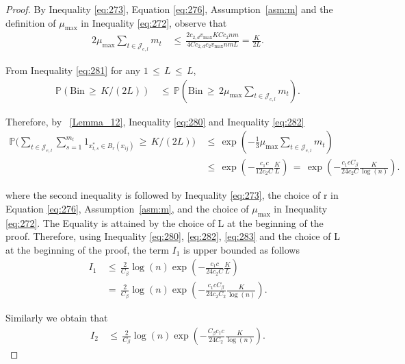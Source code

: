\documentclass[twoside,11pt]{article}
\begin{document}
\begin{proof}
By Inequality \eqref{eq:273}, Equation \eqref{eq:276}, Assumption~\ref{asm:m} and the definition of \( \mu_{\max} \) in Inequality \eqref{eq:272}, observe that
\begin{align}
    2\mu_{\max} \sum_{t \in \mathcal{J}_{e,l}} m_t 
    &\,\leq\, \frac{2c_{2,d}v_{\max} K Cc_2nm}{4Cc_{2,d}c_2v_{\max} nm L} 
    = \frac{K}{2L}. \label{eq:281}
\end{align}

From Inequality \eqref{eq:281} for any \( 1 \,\leq\, L \,\leq\, L \),
\begin{align}
    \mathbb{P}(\text{Bin} \,\geq\, K/(2L)) 
    &\,\leq\, \mathbb{P}(\text{Bin} \,\geq\, 2\mu_{\max} \sum_{t \in \mathcal{J}_{e,l}} m_t). \label{eq:282}
\end{align}

Therefore, by ~\ref{Lemma_12}, Inequality \eqref{eq:280} and Inequality \eqref{eq:282}
\begin{align}
    \mathbb{P}\Bigg( \sum_{t \in \mathcal{J}_{e,l}} \sum_{s=1}^{m_t}  1_{x_{t,s}^* \in B_{r}(x_{ij})} \,\geq\, K/(2L) \Bigg) &\,\leq\, \exp\left(-\frac{1}{3}\mu_{\max} \sum_{t \in \mathcal{J}_{e,l}} m_t \right) \nonumber \\
    &\,\leq\, \exp\left(-\frac{c_1c}{12c_2C} \frac{K}{L} \right) \,=\, \exp\left(-\frac{c_1cC_{\beta}}{24c_2C} \frac{K}{\log(n)} \right). \label{eq:283}
\end{align}

where the second inequality is followed by Inequality \eqref{eq:273}, the choice of r in Equation \eqref{eq:276}, Assumption~\ref{asm:m}, and the choice of $\mu_{\max}$ in Inequality \eqref{eq:272}. The Equality is attained by the choice of L at the beginning of the proof. Therefore, using Inequality \eqref{eq:280}, \eqref{eq:282}, \eqref{eq:283} and the choice of L at the beginning of the proof, the term \( I_1 \) is upper bounded as follows
\begin{align}
    I_1 &\,\leq\, \frac{2}{C_{\beta}} \log(n) \exp\left(-\frac{c_1c}{24c_2C} \frac{K}{L} \right) \nonumber \\
    &\,=\, \frac{2}{C_{\beta}} \log(n) \exp\left(-\frac{c_1cC_{\beta}}{24c_2C_2} \frac{K}{ \log(n)} \right). \label{eq:284}
\end{align}

Similarly we obtain that
\begin{align}
    I_2 &\,\leq\, \frac{2}{C_{\beta}} \log(n) \exp\left(-\frac{C_{\beta}c_1c}{24C_2} \frac{K}{\log(n)} \right). \label{eq:285}
\end{align}


\end{proof}
\end{document}
